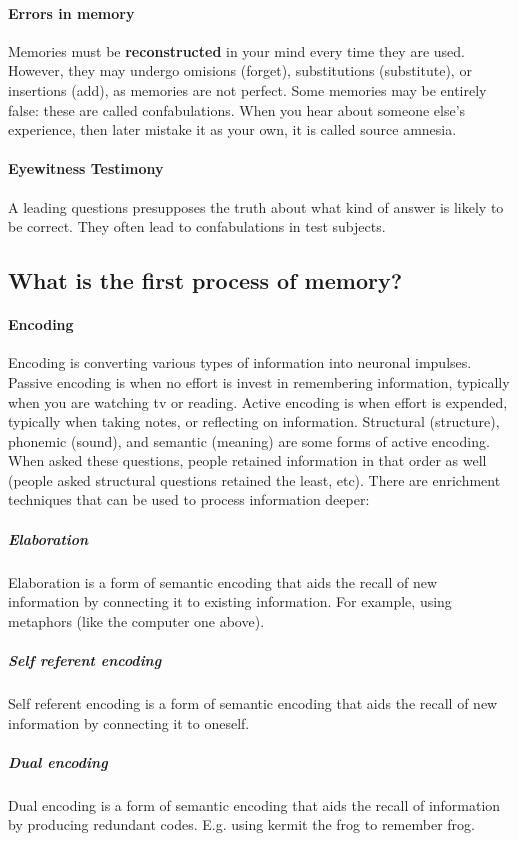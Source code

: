 \documentclass[10pt,letter]{article}
\theoremstyle{plain}
\theoremstyle{definition}
\begin{document}
\paragraph{Errors in memory}
Memories must be \textbf{reconstructed} in your mind every time they are used. However, they may undergo omisions (forget), substitutions (substitute), or insertions (add), as memories are not perfect. Some memories may be entirely false: these are called confabulations. When you hear about someone else's experience, then later mistake it as your own, it is called source amnesia. 
\paragraph{Eyewitness Testimony}
A leading questions presupposes the truth about what kind of answer is likely to be correct. They often lead to confabulations in test subjects. 

\subsection*{What is the first process of memory?}
\paragraph{Encoding}
Encoding is converting various types of information into neuronal impulses. Passive encoding is when no effort is invest in remembering information, typically when you are watching tv or reading. Active encoding is when effort is expended, typically when taking notes, or reflecting on information. Structural (structure), phonemic (sound), and semantic (meaning) are some forms of active encoding. When asked these questions, people retained information in that order as well (people asked structural questions retained the least, etc). There are enrichment techniques that can be used to process information deeper: 
\subparagraph{Elaboration}
Elaboration is a form of semantic encoding that aids the recall of new information by connecting it to existing information. For example, using metaphors (like the computer one above). 
\subparagraph{Self referent encoding}
Self referent encoding is a form of semantic encoding that aids the recall of new information by connecting it to oneself. 

\subparagraph{Dual encoding}
Dual encoding is a form of semantic encoding that aids the recall of information by producing redundant codes. E.g. using kermit the frog to remember frog. 
\end{document}
